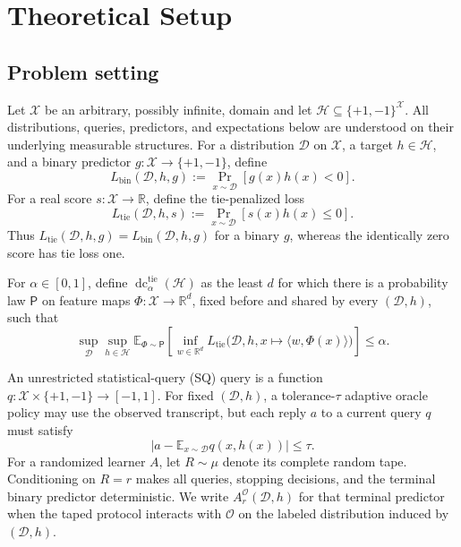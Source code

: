 \section{Theoretical Setup}\label{sec:theoretical-setup}

\subsection{Problem setting}

Let \(\mathcal X\) be an arbitrary, possibly infinite, domain and let
\(\mathcal H\subseteq\{+1,-1\}^{\mathcal X}\).  All distributions,
queries, predictors, and expectations below are understood on their
underlying measurable structures.  For a distribution \(\mathcal D\) on
\(\mathcal X\), a target \(h\in\mathcal H\), and a binary predictor
\(g:\mathcal X\to\{+1,-1\}\), define
\[
L_{\mathrm{bin}}(\mathcal D,h,g)
:=\Pr_{x\sim\mathcal D}[g(x)h(x)<0].
\]
For a real score \(s:\mathcal X\to\mathbb R\), define the tie-penalized
loss
\[
L_{\mathrm{tie}}(\mathcal D,h,s)
:=\Pr_{x\sim\mathcal D}[s(x)h(x)\le0].
\]
Thus \(L_{\mathrm{tie}}(\mathcal D,h,g)
=L_{\mathrm{bin}}(\mathcal D,h,g)\) for a binary \(g\), whereas the
identically zero score has tie loss one.

For \(\alpha\in[0,1]\), define
\(\operatorname{dc}^{\mathrm{tie}}_\alpha(\mathcal H)\) as the least
\(d\) for which there is a probability law \(\mathsf P\) on feature maps
\(\Phi:\mathcal X\to\mathbb R^d\), fixed before and shared by every
\((\mathcal D,h)\), such that
\[
\sup_{\mathcal D}\sup_{h\in\mathcal H}
\mathbb E_{\Phi\sim\mathsf P}
\left[
\inf_{w\in\mathbb R^d}
L_{\mathrm{tie}}\bigl(
\mathcal D,h,x\mapsto\langle w,\Phi(x)\rangle
\bigr)
\right]
\le\alpha.
\tag{1}\label{eq:tie-dimension-definition}
\]

An unrestricted statistical-query (SQ) query is a function
\(q:\mathcal X\times\{+1,-1\}\to[-1,1]\).  For fixed
\((\mathcal D,h)\), a tolerance-\(\tau\) adaptive oracle policy may use
the observed transcript, but each reply \(a\) to a current query \(q\)
must satisfy
\[
\left|a-\mathbb E_{x\sim\mathcal D}q(x,h(x))\right|\le\tau.
\tag{2}\label{eq:sq-tolerance}
\]
For a randomized learner \(A\), let \(R\sim\mu\) denote its complete
random tape.  Conditioning on \(R=r\) makes all queries, stopping decisions,
and the terminal binary predictor deterministic.  We write
\(A_r^{\mathcal O}(\mathcal D,h)\) for that terminal predictor when the
taped protocol interacts with \(\mathcal O\) on the labeled distribution
induced by \((\mathcal D,h)\).

